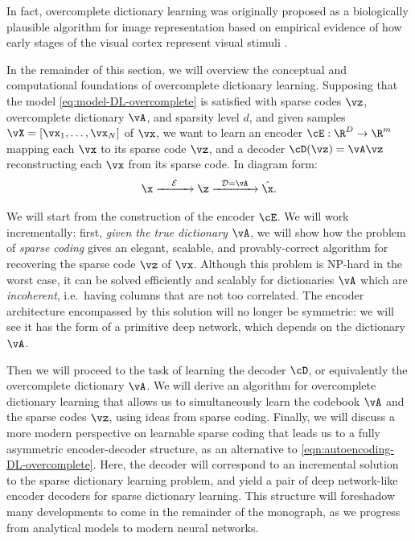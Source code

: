 \documentclass[../../book-main.tex]{subfiles}
\begin{document}
In fact, overcomplete dictionary learning was originally proposed as
a biologically plausible algorithm for image representation based on
empirical evidence of how early stages of the visual cortex represent
visual stimuli \cite{Olshausen1996-ap,Olshausen1997-yv}.

In the remainder of this section, we will overview the conceptual and
computational foundations of overcomplete dictionary learning.
Supposing that the model \eqref{eq:model-DL-overcomplete} is satisfied with
sparse codes \(\vz\), overcomplete dictionary \(\vA\), and sparsity level \(d\),
and given samples \(\vX = [\vx_1, \dots, \vx_N]\) of \(\vx\), we want to learn
an encoder \(\cE : \R^D \to \R^m\) mapping each \(\vx\) to its {sparse code}
\(\vz\), and a decoder \(\cD(\vz) = \vA \vz\) reconstructing each \(\vx\) from
its sparse code. %
In diagram form:
\begin{equation}
    \x \xrightarrow{\hspace{4mm} \mathcal{E} \hspace{4mm}}  \z
    \xrightarrow{\hspace{2mm} \mathcal{D} = \vA \hspace{2mm}}   \hat{\x}.
    \label{eqn:autoencoding-DL-overcomplete}
\end{equation}

We will start from the construction of the encoder $\cE$.
We will work incrementally: first, \textit{given the true dictionary
$\vA$}, we will show how the problem of \textit{sparse coding} gives
an elegant, scalable, and provably-correct algorithm for recovering
the sparse code $\vz$ of $\vx$.
Although this problem is NP-hard in the worst case, it can be solved
efficiently and scalably for dictionaries $\vA$ which are
\textit{incoherent}, i.e.\ having columns that are not too correlated.
The encoder architecture encompassed by this solution will no longer
be symmetric: we will see it has the form of a primitive deep
network, which depends on the dictionary $\vA$.

Then we will proceed to the task of learning the decoder $\cD$, or
equivalently the overcomplete dictionary $\vA$.
We will derive an algorithm for overcomplete dictionary learning that allows us
to simultaneously learn the codebook $\vA$ and the sparse codes
$\vz$, using ideas from sparse coding.
Finally, we will discuss a more modern perspective on learnable
sparse coding that leads us to a fully asymmetric encoder-decoder
structure, as an alternative to \eqref{eqn:autoencoding-DL-overcomplete}.
Here, the decoder will correspond to an incremental solution to the
sparse dictionary learning problem, and yield a pair of deep
network-like encoder decoders for sparse dictionary learning.
This structure will foreshadow many developments to come in the remainder of the
monograph, as we progress from analytical models to modern neural networks.
\end{document}
